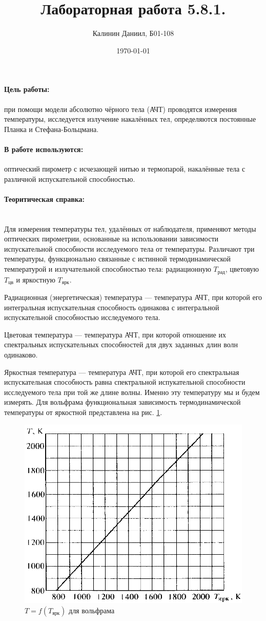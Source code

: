 \documentclass[a4paper, 12pt]{article}
\author{Калинин Даниил, Б01-108}
\date{\today}
\title{Лабораторная работа 5.8.1.}
\newcommand{\parag}[1]{\paragraph*{#1:}}
\begin{document}
\maketitle
\parindent=0cm

\parag {Цель работы}
при помощи модели абсолютно чёрного тела (АЧТ) проводятся измерения температуры, исследуется излучение накалённых тел, определяются постоянные Планка и Стефана-Больцмана. 


\parag {В работе используются}
оптический пирометр с исчезающей нитью и термопарой, накалённые тела с различной испускательной способностью.


\parag {Теоритическая справка} ~\\
Для измерения температуры тел, удалённых от наблюдателя, применяют методы оптических пирометрии, основанные на использовании зависимости испускательной способности исследуемого тела от температуры. Различают три температуры, функционально связанные с истинной термодинамической температурой и излучательной способностью тела: радиационную $T_{рад}$, цветовую $T_{цв}$ и яркостную $T_{ярк}$.

Радиационная (энергетическая) температура --- температура АЧТ, при которой его интегральная испускательная способность одинакова с интегральной испускательной способностью исследуемого тела.

Цветовая температура --- температура АЧТ, при которой отношение их спектральных испускательных способностей для двух заданных длин волн одинаково.

Яркостная температура --- температура АЧТ, при которой его спектральная испускательная способность равна спектральной испукательной способности исследуемого тела при той же длине волны. Именно эту температуру мы и будем измерять. Для вольфрама функциональная зависимость термодинамической температуры от яркостной представлена на рис. \ref{fig:wolfram}.

\begin{figure}[H]
    \includegraphics[scale = 0.4]{wolfram_brightness}
    \centering
    \caption{$T = f(T_{ярк})$ для вольфрама}
    \label{fig:wolfram}
\end{figure}
\end{document}
